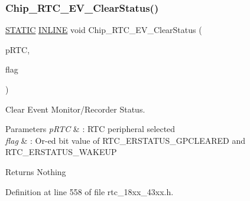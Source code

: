 \subsubsection{\texorpdfstring{Chip\+\_\+\+R\+T\+C\+\_\+\+E\+V\+\_\+\+Clear\+Status()}{Chip\_RTC\_EV\_ClearStatus()}}
{\footnotesize\ttfamily \hyperlink{group___l_p_c___types___public___macros_ga10b2d890d871e1489bb02b7e70d9bdfb}{S\+T\+A\+T\+IC} \hyperlink{spifi__18xx__43xx_8h_a2eb6f9e0395b47b8d5e3eeae4fe0c116}{I\+N\+L\+I\+NE} void Chip\+\_\+\+R\+T\+C\+\_\+\+E\+V\+\_\+\+Clear\+Status (\begin{DoxyParamCaption}\item[{\hyperlink{struct_l_p_c___r_t_c___t}{L\+P\+C\+\_\+\+R\+T\+C\+\_\+T} $\ast$}]{p\+R\+TC,  }\item[{uint32\+\_\+t}]{flag }\end{DoxyParamCaption})}



Clear Event Monitor/\+Recorder Status. 


\begin{DoxyParams}{Parameters}
{\em p\+R\+TC} & \+: R\+TC peripheral selected \\
\hline
{\em flag} & \+: Or-\/ed bit value of R\+T\+C\+\_\+\+E\+R\+S\+T\+A\+T\+U\+S\+\_\+\+G\+P\+C\+L\+E\+A\+R\+ED and R\+T\+C\+\_\+\+E\+R\+S\+T\+A\+T\+U\+S\+\_\+\+W\+A\+K\+E\+UP \\
\hline
\end{DoxyParams}
\begin{DoxyReturn}{Returns}
Nothing 
\end{DoxyReturn}


Definition at line 558 of file rtc\+\_\+18xx\+\_\+43xx.\+h.

\mbox{\label{group___r_t_c__18_x_x__43_x_x_ga522a16f061cbc11f00e2a6681da07ad2}} 
